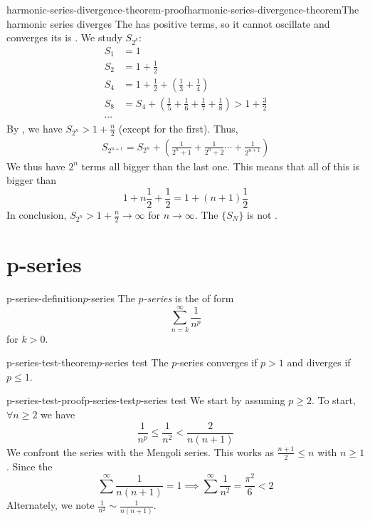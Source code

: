 \documentclass[preview]{standalone}
\begin{document}
\begin{snippetproof}{harmonic-series-divergence-theorem-proof}{harmonic-series-divergence-theorem}{The harmonic series diverges}
    The \series has positive terms, so it cannot oscillate and converges \ifandonlyif its \partialsum \sequence
    is . We study \(S_{2^k}\):
    \begin{align*}
        S_1 &= 1 \\
        S_2 &= 1 + \frac{1}{2} \\
        S_4 &= 1 + \frac{1}{2} + \left(\frac{1}{3} + \frac{1}{4}\right) \\
        S_8 &= S_4 + \left(\frac{1}{5} + \frac{1}{6} + \frac{1}{7} + \frac{1}{8}\right) > 1 + \frac{3}{2} \\
        \cdots
    \end{align*}
    By \principleofinduction[induction], we have \(S_{2^n} > 1 + \frac{n}{2}\) (except for the first).
    Thus, \begin{align*}
        S_{2^{n+1}} = S_{2^n} + \left(\frac{1}{2^n + 1} + \frac{1}{2^n + 2} \cdots + \frac{1}{2^{n+1}}\right)
    \end{align*}
    We thus have \(2^n\) terms all bigger than the last one.
    This means that all of this is bigger than
    \[
        1 + n\frac{1}{2} + \frac{1}{2} = 1 + (n+1)\frac{1}{2}
    \]
    In conclusion, \(S_{2^n} > 1 + \frac{n}{2} \to \infty\) for \(n\to \infty\).
    The \sequence \(\{S_N\}\) is not .
\end{snippetproof}

\section{p-series}

\begin{snippetdefinition}{p-series-definition}{\(p\)-series}
    The \emph{\(p\)-series} is the \series of form
    \[\sum_{n=k}^\infty \frac{1}{n^p}\]
    for \(k > 0\).
\end{snippetdefinition}


\begin{snippettheorem}{p-series-test-theorem}{\(p\)-series test}
    The \(p\)-series converges if \(p > 1\) and diverges if \(p \leq 1\).
\end{snippettheorem}

\begin{snippetproof}{p-series-test-proof}{p-series-test}{\(p\)-series test}
    We start by assuming \(p \geq 2\).
    To start, \(\forall n \geq 2\) we have
    \[
        \frac{1}{n^p} \leq \frac{1}{n^2} < \frac{2}{n(n+1)}
    \]
    We confront the series with the Mengoli series.
    This works as \(\frac{n+1}{2} \leq n\) with \(n \geq 1\).
    Since the \series
    \[
        \sum^\infty \frac{1}{n(n+1)} = 1 \implies \sum^\infty \frac{1}{n^2} = \frac{\pi^2}{6} < 2
    \]
    Alternately, we note \(\frac{1}{n^2} \sim \frac{1}{n(n+1)}\).
    \todo
\end{snippetproof}
\end{document}
